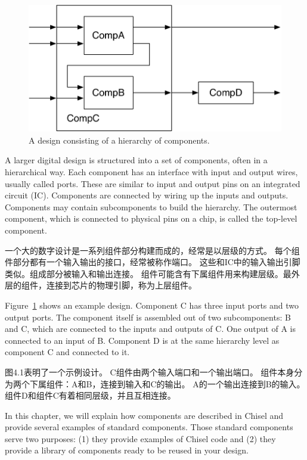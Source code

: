 \documentclass[%
    10pt,
    headinclude, footexclude,
    openright, %
    notitlepage,
    cleardoubleempty,
    headsepline,
    pointlessnumbers,
    bibtotoc, idxtotoc,
    ]{scrbook}
\newcommand{\scale}{0.7}
\begin{document}
\begin{figure}
  \centering
  \includegraphics[scale=\scale]{figures/components}
  \caption{A design consisting of a hierarchy of components.}
  \label{fig:components}
\end{figure}


A larger digital design is structured into a set of components, often in
a hierarchical way. Each component has an interface with input and output
wires, usually called ports. These are similar to input and output pins on an integrated circuit (IC).
Components are connected by wiring up the inputs and outputs.
Components may contain subcomponents to build the hierarchy.
The outermost component, which is connected to physical pins
on a chip, is called the top-level component.

一个大的数字设计是一系列组件部分构建而成的，经常是以层级的方式。
每个组件部分都有一个输入输出的接口，经常被称作端口。
这些和IC中的输入输出引脚类似。组成部分被输入和输出连接。
组件可能含有下属组件用来构建层级。最外层的组件，连接到芯片的物理引脚，称为上层组件。

Figure~\ref{fig:components} shows an example design. Component C has
three input ports and two output ports. The component itself is assembled out
of two subcomponents: B and C, which are connected to the inputs and
outputs of C. One output of A is connected to an input of B.
Component D is at the same hierarchy level as component C and connected
to it.

图4.1表明了一个示例设计。
C组件由两个输入端口和一个输出端口。
组件本身分为两个下属组件：A和B，连接到输入和C的输出。
A的一个输出连接到B的输入。
组件D和组件C有着相同层级，并且互相连接。


In this chapter, we will explain how components are described in Chisel and
provide several examples of standard components.
Those standard components serve two purposes: (1) they provide examples
of Chisel code and (2) they provide a library of components ready to be reused
in your design.
\end{document}
